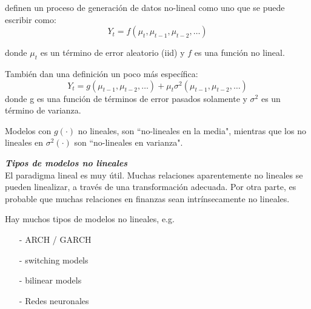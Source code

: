 	\cite{campbell1997econometrics} definen un proceso de generaci\'on de datos no-lineal como uno que se puede escribir como:\\
	\begin{equation}
	Y_t = f(\mu_t,\mu_{t-1} ,\mu_{t-2},\dots{})
	\end{equation}
	
	donde $\mu_t$ es un t\'ermino de error aleatorio (iid) y $f$ es una funci\'on no lineal.\\
	\vspace{4mm}	
	

	
	Tambi\'en dan una definici\'on un poco m\'as espec\'{i}fica:
	\begin{equation}
	Y_t = g(\mu_{t-1} ,\mu_{t-2},\dots{}) + \mu_t \sigma^2(\mu_{t-1} ,\mu_{t-2},\dots{})
	\end{equation}
	donde g es una funci\'on de t\'erminos de error pasados solamente y  $\sigma^2$ es un t\'ermino de varianza.
	\vspace{4mm}	
	
	Modelos con $g(\cdot)$ no lineales, son ``no-lineales en la media", mientras que los no lineales en $\sigma^2(\cdot)$ son ``no-lineales en varianza".
	

	\textit{\textbf{Tipos de modelos no lineales}}\\
	El paradigma lineal es muy \'util. Muchas relaciones aparentemente no lineales se pueden linealizar, a trav\'es de una transformaci\'on adecuada. Por otra parte, es probable que muchas relaciones en finanzas sean intr\'{i}nsecamente no lineales.\\
	\vspace{4mm}	
	
	Hay muchos tipos de modelos no lineales, e.g.\\
		\begin{itemize}
			\item[-] ARCH / GARCH
			\item[-] switching models
			\item[-] bilinear models
			\item[-] Redes neuronales
		\end{itemize}

